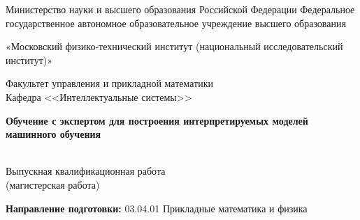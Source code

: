\begin{titlepage}
    	\begin{center}
        		Министерство науки и высшего образования Российской Федерации Федеральное государственное автономное образовательное учреждение высшего образования
       
		«Московский физико-технический институт (национальный исследовательский институт)»

        		Факультет управления и прикладной математики\\
        		Кафедра <<Интеллектуальные системы>>\\
    	\end{center}

    	\vspace{2cm}

    	\begin{center}
       		\Large \bf Обучение с экспертом для построения интерпретируемых моделей машинного обучения
    	\end{center}
    
    	\begin{center}
		~\\[-28pt]
		Выпускная квалификационная работа\\
		(магистерская работа)
	\end{center}
	
	\vspace{0.05cm}
	    
    \begin{center}
    	\textbf{Направление подготовки:} 03.04.01 Прикладные математика и физика
    \end{center}



\end{titlepage}
